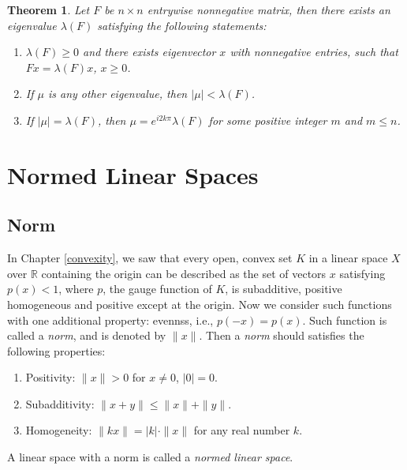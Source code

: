 \documentclass[11pt]{book}
\newtheorem{theorem}{Theorem}[section]
\theoremstyle{definition}
\numberwithin{equation}{chapter}
\begin{document}
\medskip

\begin{theorem}
Let $F$ be $n \times n$ entrywise nonnegative matrix, then there exists an eigenvalue $\lambda(F)$ satisfying the following statements:
\begin{enumerate}[label=(\alph*)]
    \item $\lambda(F) \geq 0$ and there exists eigenvector $x$ with nonnegative entries, such that $Fx = \lambda(F) x$, $x \geq 0$.
    
    \item If $\mu$ is any other eigenvalue, then $|\mu| < \lambda(F)$.
    
    \item If $|\mu| = \lambda(F)$, then $\mu = e^{i2k\pi} \lambda(F)$ for some positive integer $m$ and $m \leq n$.
\end{enumerate}
\end{theorem}



\chapter{Normed Linear Spaces}

\section{Norm}

In Chapter \ref{convexity}, we saw that every open, convex set $K$ in a linear space $X$ over $\mathbb{R}$ containing the origin can be described as the set of vectors $x$ satisfying $p(x) < 1$, where $p$, the gauge function of $K$, is subadditive, positive homogeneous and positive except at the origin. Now we consider such functions with one additional property: evennss, i.e., $p(-x) = p(x)$. Such function is called a {\em norm}, and is denoted by $\|x\|$. Then a {\em norm} should satisfies the following properties:
\begin{enumerate}[label=(\roman*)]
    \item Positivity: $\|x\| > 0$ for $x \neq 0$, $|0| = 0$.
    
    \item Subadditivity: $\|x + y\| \leq \|x\| + \|y\|$.
    
    \item Homogeneity: $\|kx\| = |k| \cdot\|x\|$ for any real number $k$.
\end{enumerate}
A linear space with a norm is called a {\em normed linear space}.
\end{document}

